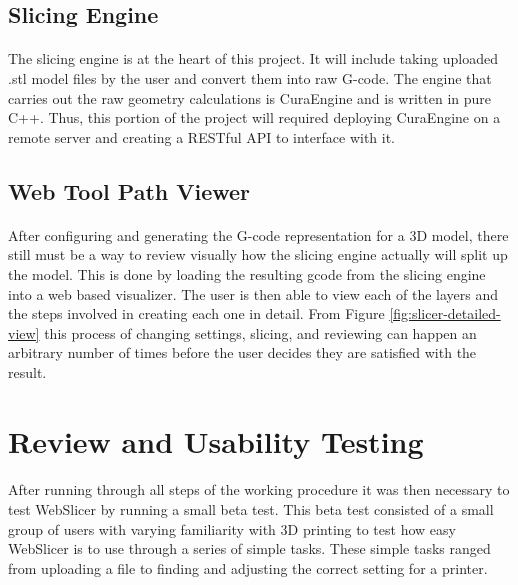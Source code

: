 \subsection{Slicing Engine}
\paragraph{}
The slicing engine is at the heart of this project. 
It will include taking uploaded .stl model files by the user and convert them into raw G-code. 
The engine that carries out the raw geometry calculations is CuraEngine and is written in pure C++.
Thus, this portion of the project will required deploying CuraEngine on a remote server and creating a RESTful API to interface with it.

\subsection{Web Tool Path Viewer}
\paragraph{}
After configuring and generating the G-code representation for a 3D model, there still must be a way to review visually how the slicing engine actually will split up the model.
This is done by loading the resulting gcode from the slicing engine into a web based visualizer.
The user is then able to view each of the layers and the steps involved in creating each one in detail.
From Figure \ref{fig:slicer-detailed-view} this process of changing settings, slicing, and reviewing can happen an arbitrary number of times before the user decides they are satisfied with the result.

\section{Review and Usability Testing}
\paragraph{}
After running through all steps of the working procedure it was then necessary to test WebSlicer by running a small beta test. 
This beta test consisted of a small group of users with varying familiarity with 3D printing to test how easy WebSlicer is to use through a series of simple tasks.
These simple tasks ranged from uploading a file to finding and adjusting the correct setting for a printer.

